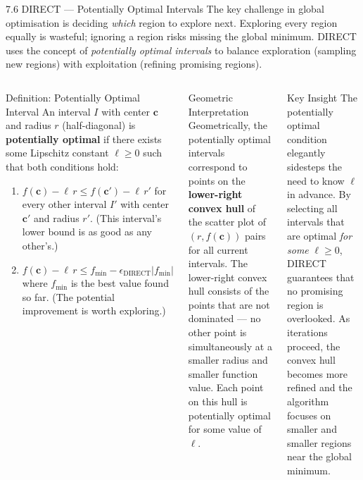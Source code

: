 \documentclass[aspectratio=169,10pt]{beamer}
\begin{document}
\begin{frame}[allowframebreaks]{7.6 DIRECT --- Potentially Optimal Intervals}
  The key challenge in global optimisation is deciding \emph{which}
  region to explore next.  Exploring every region equally is
  wasteful; ignoring a region risks missing the global minimum.
  DIRECT uses the concept of \emph{potentially optimal intervals}
  to balance exploration (sampling new regions) with exploitation
  (refining promising regions).

  \begin{columns}[T]
      \begin{block}{Definition: Potentially Optimal Interval}
        An interval $I$ with center $\mathbf{c}$ and radius $r$
        (half-diagonal) is \textbf{potentially optimal} if there
        exists some Lipschitz constant $\ell \ge 0$ such that both
        conditions hold:
        \begin{enumerate}\setlength\itemsep{3pt}
          \item $f(\mathbf{c}) - \ell\,r \le f(\mathbf{c}') - \ell\,r'$
                for every other interval $I'$ with center $\mathbf{c}'$
                and radius $r'$.
                (This interval's lower bound is as good as any other's.)
          \item $f(\mathbf{c}) - \ell\,r \le f_{\min} - \epsilon_{\text{DIRECT}}
                |f_{\min}|$
                where $f_{\min}$ is the best value found so far.
                (The potential improvement is worth exploring.)
        \end{enumerate}
      \end{block}

      \begin{block}{Geometric Interpretation}
        Geometrically, the potentially optimal intervals correspond to
        points on the \textbf{lower-right convex hull} of the scatter
        plot of $(r, f(\mathbf{c}))$ pairs for all current intervals.
        The lower-right convex hull consists of the points that are not
        dominated --- no other point is simultaneously at a smaller
        radius and smaller function value.  Each point on this hull
        is potentially optimal for some value of $\ell$.
      \end{block}

      \begin{alertblock}{Key Insight}
        The potentially optimal condition elegantly sidesteps the need
        to know $\ell$ in advance.  By selecting all intervals that
        are optimal \emph{for some} $\ell \ge 0$, DIRECT guarantees
        that no promising region is overlooked.  As iterations proceed,
        the convex hull becomes more refined and the algorithm focuses
        on smaller and smaller regions near the global minimum.
      \end{alertblock}


\end{columns}
\end{frame}
\end{document}
